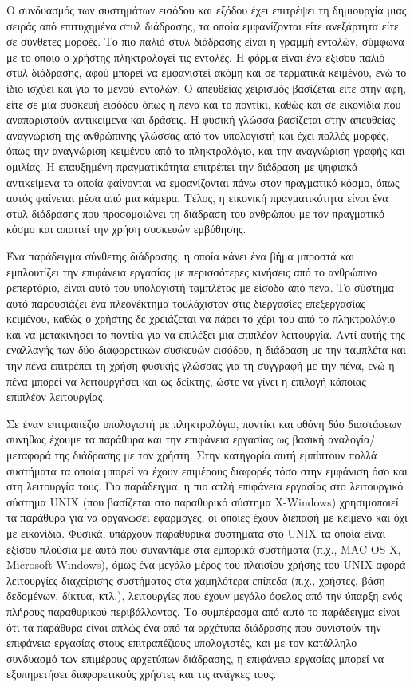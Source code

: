\documentclass[
]{article}
\begin{document}
Ο συνδυασμός των συστημάτων εισόδου και εξόδου έχει επιτρέψει τη
δημιουργία μιας σειράς από επιτυχημένα στυλ διάδρασης, τα οποία
εμφανίζονται είτε ανεξάρτητα είτε σε σύνθετες μορφές. Το πιο παλιό στυλ
διάδρασης είναι η γραμμή εντολών, σύμφωνα με το οποίο ο χρήστης
πληκτρολογεί τις εντολές. Η φόρμα είναι ένα εξίσου παλιό στυλ διάδρασης,
αφού μπορεί να εμφανιστεί ακόμη και σε τερματικά κειμένου, ενώ το ίδιο
ισχύει και για το μενού~εντολών. Ο απευθείας χειρισμός βασίζεται είτε
στην αφή, είτε σε μια συσκευή εισόδου όπως η πένα και το ποντίκι, καθώς
και σε εικονίδια που αναπαριστούν αντικείμενα και δράσεις. Η φυσική
γλώσσα βασίζεται στην απευθείας αναγνώριση της ανθρώπινης γλώσσας από
τον υπολογιστή και έχει πολλές μορφές, όπως την αναγνώριση κειμένου από
το πληκτρολόγιο, και την αναγνώριση γραφής και ομιλίας. Η επαυξημένη
πραγματικότητα επιτρέπει την διάδραση με ψηφιακά αντικείμενα τα οποία
φαίνονται να εμφανίζονται πάνω στον πραγματικό κόσμο, όπως αυτός
φαίνεται μέσα από μια κάμερα. Τέλος, η εικονική πραγματικότητα είναι ένα
στυλ διάδρασης που προσομοιώνει τη διάδραση του ανθρώπου με τον
πραγματικό κόσμο και απαιτεί την χρήση συσκευών εμβύθησης.

Ένα παράδειγμα σύνθετης διάδρασης, η οποία κάνει ένα βήμα μπροστά και
εμπλουτίζει την επιφάνεια εργασίας με περισσότερες κινήσεις από το
ανθρώπινο ρεπερτόριο, είναι αυτό του υπολογιστή ταμπλέτας με είσοδο από
πένα. Το σύστημα αυτό παρουσιάζει ένα πλεονέκτημα τουλάχιστον στις
διεργασίες επεξεργασίας κειμένου, καθώς ο χρήστης δε χρειάζεται να πάρει
το χέρι του από το πληκτρολόγιο και να μετακινήσει το ποντίκι για να
επιλέξει μια επιπλέον λειτουργία. Αντί αυτής της εναλλαγής των δύο
διαφορετικών συσκευών εισόδου, η διάδραση με την ταμπλέτα και την πένα
επιτρέπει τη χρήση φυσικής γλώσσας για τη συγγραφή με την πένα, ενώ η
πένα μπορεί να λειτουργήσει και ως δείκτης, ώστε να γίνει η επιλογή
κάποιας επιπλέον λειτουργίας.

Σε έναν επιτραπέζιο υπολογιστή με πληκτρολόγιο, ποντίκι και οθόνη δύο
διαστάσεων συνήθως έχουμε τα παράθυρα και την επιφάνεια εργασίας ως
βασική αναλογία/μεταφορά της διάδρασης με τον χρήστη. Στην κατηγορία
αυτή εμπίπτουν πολλά συστήματα τα οποία μπορεί να έχουν επιμέρους
διαφορές τόσο στην εμφάνιση όσο και στη λειτουργία τους. Για παράδειγμα,
η πιο απλή επιφάνεια εργασίας στο λειτουργικό σύστημα UNIX (που
βασίζεται στο παραθυρικό σύστημα X-Windows) χρησιμοποιεί τα παράθυρα για
να οργανώσει εφαρμογές, οι οποίες έχουν διεπαφή με κείμενο και όχι με
εικονίδια. Φυσικά, υπάρχουν παραθυρικά συστήματα στο UNIX τα οποία είναι
εξίσου πλούσια με αυτά που συναντάμε στα εμπορικά συστήματα (π.χ., MAC
OS X, Microsoft Windows), όμως ένα μεγάλο μέρος του πλαισίου χρήσης του
UNIX αφορά λειτουργίες διαχείρισης συστήματος στα χαμηλότερα επίπεδα
(π.χ., χρήστες, βάση δεδομένων, δίκτυα, κτλ.), λειτουργίες που έχουν
μεγάλο όφελος από την ύπαρξη ενός πλήρους παραθυρικού περιβάλλοντος. Το
συμπέρασμα από αυτό το παράδειγμα είναι ότι τα παράθυρα είναι απλώς ένα
από τα αρχέτυπα διάδρασης που συνιστούν την επιφάνεια εργασίας στους
επιτραπέζιους υπολογιστές, και με τον κατάλληλο συνδυασμό των επιμέρους
αρχετύπων διάδρασης, η επιφάνεια εργασίας μπορεί να εξυπηρετήσει
διαφορετικούς χρήστες και τις ανάγκες τους.
\end{document}
